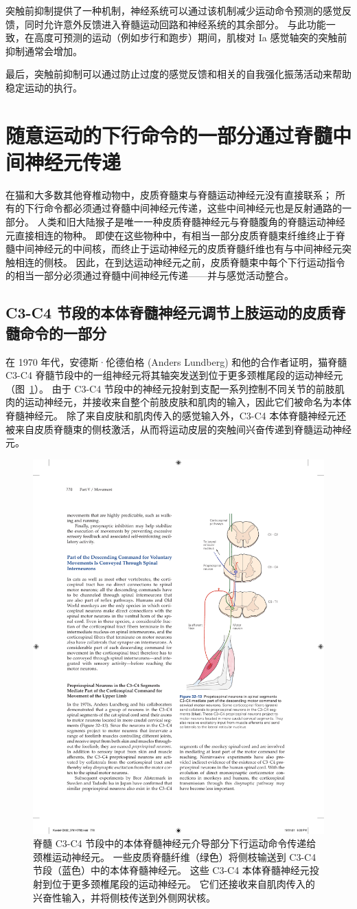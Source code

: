突触前抑制提供了一种机制，神经系统可以通过该机制减少运动命令预测的感觉反馈，同时允许意外反馈进入脊髓运动回路和神经系统的其余部分。
与此功能一致，在高度可预测的运动（例如步行和跑步）期间，肌梭对 Ia 感觉轴突的突触前抑制通常会增加。


最后，突触前抑制可以通过防止过度的感觉反馈和相关的自我强化振荡活动来帮助稳定运动的执行。



\section{随意运动的下行命令的一部分通过脊髓中间神经元传递}

在猫和大多数其他脊椎动物中，皮质脊髓束与脊髓运动神经元没有直接联系；
所有的下行命令都必须通过脊髓中间神经元传递，这些中间神经元也是反射通路的一部分。
人类和旧大陆猴子是唯一一种皮质脊髓神经元与脊髓腹角的脊髓运动神经元直接相连的物种。
即使在这些物种中，有相当一部分皮质脊髓束纤维终止于脊髓中间神经元的中间核，而终止于运动神经元的皮质脊髓纤维也有与中间神经元突触相连的侧枝。
因此，在到达运动神经元之前，皮质脊髓束中每个下行运动指令的相当一部分必须通过脊髓中间神经元传递——并与感觉活动整合。



\subsection{C3-C4 节段的本体脊髓神经元调节上肢运动的皮质脊髓命令的一部分}

在 1970 年代，安德斯·伦德伯格 (Anders Lundberg) 和他的合作者证明，猫脊髓 C3-C4 脊髓节段中的一组神经元将其轴突发送到位于更多颈椎尾段的运动神经元（图~\ref{fig:32_13}）。
由于 C3-C4 节段中的神经元投射到支配一系列控制不同关节的前肢肌肉的运动神经元，并接收来自整个前肢皮肤和肌肉的输入，因此它们被命名为本体脊髓神经元。
除了来自皮肤和肌肉传入的感觉输入外，C3-C4 本体脊髓神经元还被来自皮质脊髓束的侧枝激活，从而将运动皮层的突触间兴奋传递到脊髓运动神经元。


\begin{figure}[htbp]
	\centering
	\includegraphics[width=0.5\linewidth]{chap32/fig_32_13}
	\caption{脊髓 C3-C4 节段中的本体脊髓神经元介导部分下行运动命令传递给颈椎运动神经元。 一些皮质脊髓纤维（绿色）将侧枝输送到 C3-C4 节段（蓝色）中的本体脊髓神经元。 这些 C3-C4 本体脊髓神经元投射到位于更多颈椎尾段的运动神经元。 它们还接收来自肌肉传入的兴奋性输入，并将侧枝传送到外侧网状核。}
	\label{fig:32_13}
\end{figure}


